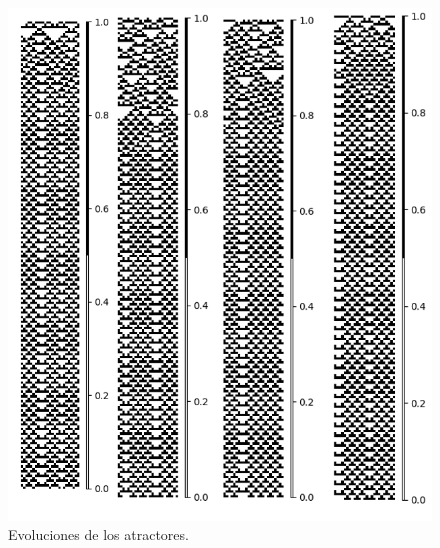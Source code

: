 \documentclass[11pt]{article}
\begin{document}
			\begin{figure}[H]
			\centering
			\includegraphics[scale=0.3]{resources/Atractores54/atractor_54_size_25_res.png}
			\caption{Evoluciones de los atractores.}\label{fig:picture}
			\end{figure}
\end{document}
